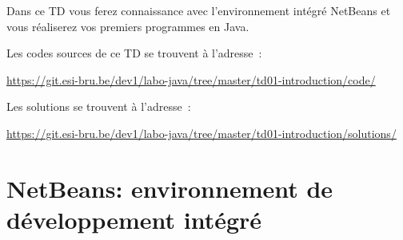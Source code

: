 \documentclass[a4paper,11pt]{article}
\date{2018 -- 2019}
\newcommand{\publicbasepath}{https://git.esi-bru.be/dev1/labo-java/tree/master/td01-introduction}
\newcommand{\solutionspublicpath}{\publicbasepath/solutions/}
\renewcommand{\listingpublicpath}{\publicbasepath/code/}
\begin{document}
\entete
\titre

\lastedit


	Dans ce TD vous ferez connaissance avec l'environnement intégré NetBeans et 
	vous réaliserez vos premiers programmes en Java.

	Les codes sources de ce TD se trouvent à l'adresse~: 
	
	\url{\listingpublicpath}
	
	Les solutions se trouvent à l'adresse~:
	
	\url{\solutionspublicpath}

	\tableofcontents

	\newpage

\section{NetBeans: environnement de développement intégré }
\end{document}
